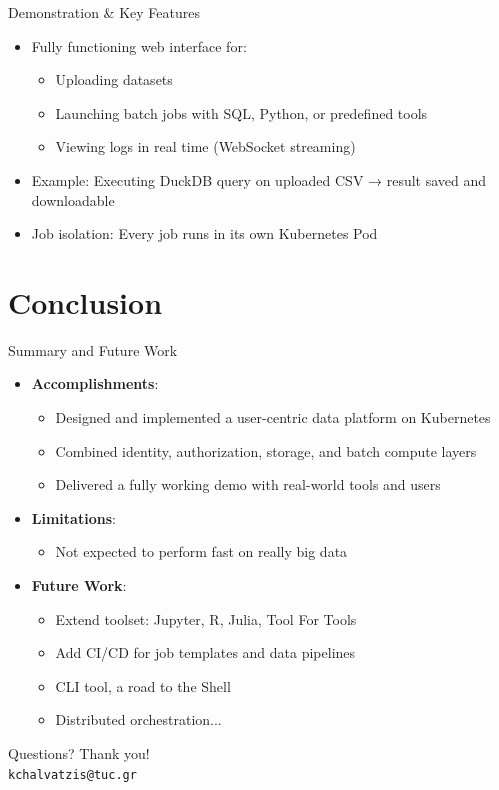 \documentclass{beamer}
\begin{document}
\begin{frame}{Demonstration \& Key Features}
  \begin{itemize}
    \item Fully functioning web interface for:
    \begin{itemize}
      \item Uploading datasets
      \item Launching batch jobs with SQL, Python, or predefined tools
      \item Viewing logs in real time (WebSocket streaming)
    \end{itemize}
    \item Example: Executing DuckDB query on uploaded CSV → result saved and downloadable
    \item Job isolation: Every job runs in its own Kubernetes Pod
  \end{itemize}
\end{frame}



\section{Conclusion}
\begin{frame}{Summary and Future Work}
  \begin{itemize}
    \item \textbf{Accomplishments}:
    \begin{itemize}
      \item Designed and implemented a user-centric data platform on Kubernetes
      \item Combined identity, authorization, storage, and batch compute layers
      \item Delivered a fully working demo with real-world tools and users
    \end{itemize}
    \item \textbf{Limitations}:
      \begin{itemize}
        \item Not expected to perform fast on really big data
      \end{itemize} 
    \item \textbf{Future Work}:
    \begin{itemize}
      \item Extend toolset: Jupyter, R, Julia, Tool For Tools
      \item Add CI/CD for job templates and data pipelines
      \item CLI tool, a road to the Shell 
      \item Distributed orchestration...
    \end{itemize}
  \end{itemize}
\end{frame}


\begin{frame}{Questions?}
  \centering
  \Huge Thank you! \\
  \vspace{1em}
  \normalsize
  \texttt{kchalvatzis@tuc.gr}
\end{frame}
\end{document}
